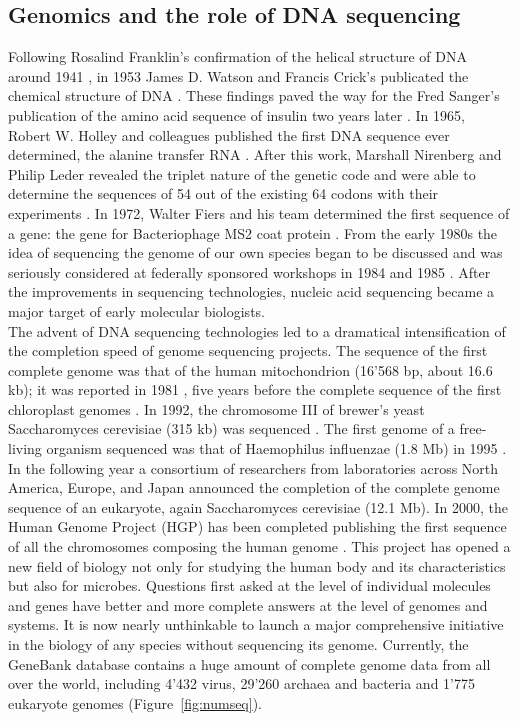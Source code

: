 \subsection{Genomics and the role of DNA sequencing\label{par:genomics}}
Following Rosalind Franklin's confirmation of the helical structure of DNA around 1941 \cite{maddox2012rosalind}, in 1953 James D. Watson and Francis Crick's publicated the chemical structure of DNA \cite{watson1953molecular}. These findings paved the way for the Fred Sanger's publication of the amino acid sequence of insulin two years later \cite{sanger1953amino}. In 1965, Robert W. Holley and colleagues published the first DNA sequence ever determined, the alanine transfer RNA \cite{holley1965nucleotide}. After this work, Marshall Nirenberg and Philip Leder revealed the triplet nature of the genetic code and were able to determine the sequences of 54 out of the existing 64 codons with their experiments \cite{nirenberg1965rna}. In 1972, Walter Fiers and his team determined the first sequence of a gene: the gene for Bacteriophage MS2 coat protein \cite{jou1972nucleotide}. From the early 1980s the idea of sequencing the genome of our own species began to be discussed and was seriously considered at federally sponsored workshops in 1984 and 1985 \cite{lambright2002managing}. After the improvements in sequencing technologies, nucleic acid sequencing became a major target of early molecular biologists.\\
The advent of DNA sequencing technologies led to a dramatical intensification of the completion speed of genome sequencing projects. The sequence of the first complete genome was that of the human mitochondrion (16'568 bp, about 16.6 kb); it was reported in 1981 \cite{anderson1981sequence}, five years before the complete sequence of the first chloroplast genomes \cite{shinozaki1986complete}. In 1992, the chromosome III of brewer's yeast Saccharomyces cerevisiae (315 kb) was sequenced \cite{oliver1992complete}. The first genome of a free-living organism sequenced was that of Haemophilus influenzae (1.8 Mb) in 1995 \cite{fleischmann1995whole}. In the following year a consortium of researchers from laboratories across North America, Europe, and Japan announced the completion of the complete genome sequence of an eukaryote, again Saccharomyces cerevisiae (12.1 Mb). In 2000, the Human Genome Project (HGP) has been completed publishing the first sequence of all the chromosomes composing the human genome \cite{collins1998new}. This project has opened a new field of biology not only for studying the human body and its characteristics but also for microbes. Questions first asked at the level of individual molecules and genes have better and more complete answers at the level of genomes and systems. It is now nearly unthinkable to launch a major comprehensive initiative in the biology of any species without sequencing its genome. Currently, the GeneBank database contains a huge amount of complete genome data from all over the world, including 4'432 virus, 29'260 archaea and bacteria and 1'775 eukaryote genomes (Figure~\ref{fig:numseq}).\\%
